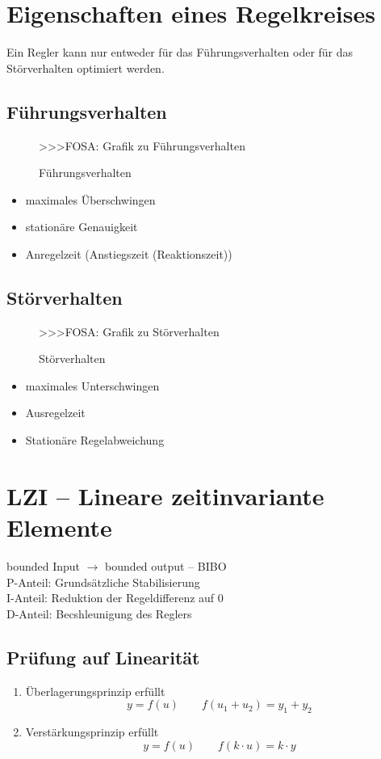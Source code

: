 \section{Eigenschaften eines Regelkreises}
Ein Regler kann nur entweder für das Führungsverhalten oder für das 
Störverhalten optimiert werden. 

\subsection{Führungsverhalten}
\begin{figure}[h!]
    \centering
    >>>FOSA: Grafik zu Führungsverhalten
    \caption{Führungsverhalten}
    \label{fig:fhr}
\end{figure}
\begin{itemize}
  \item maximales Überschwingen
  \item stationäre Genauigkeit
  \item Anregelzeit (Anstiegszeit (Reaktionszeit))
\end{itemize}

\subsection{Störverhalten}
\begin{figure}[h!]
    \centering
    >>>FOSA: Grafik zu Störverhalten
    \caption{Störverhalten}
    \label{fig:str}
\end{figure}
\begin{itemize}
  \item maximales Unterschwingen
  \item Ausregelzeit
  \item Stationäre Regelabweichung
\end{itemize}

\section{LZI -- Lineare zeitinvariante Elemente}
bounded Input $\rightarrow$ bounded output -- BIBO\\
P-Anteil: Grundsätzliche Stabilisierung \\
I-Anteil: Reduktion der Regeldifferenz auf 0 \\
D-Anteil: Becshleunigung des Reglers

\subsection{Prüfung auf Linearität}
\begin{enumerate}
  \item Überlagerungsprinzip erfüllt 
        \[ y = f(u) \qquad f(u_1 + u_2) = y_1 + y_2 \]
  \item Verstärkungsprinzip erfüllt
        \[ y = f(u) \qquad f(k \cdot u) = k \cdot y \]
\end{enumerate}

